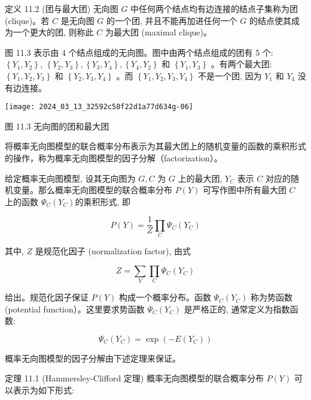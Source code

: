 \documentclass[10pt]{article}
\begin{document}
\begin{CJK*}{UTF8}{bsmi}
定义 11.2 (团与最大团) 无向图 $G$ 中任何两个结点均有边连接的结点子集称为团 (clique)。若 $C$ 是无向图 $G$ 的一个团, 并且不能再加进任何一个 $G$ 的结点使其成为一个更大的团, 则称此 $C$ 为最大团 (maximal clique)。

图 11.3 表示由 4 个结点组成的无向图。图中由两个结点组成的团有 5 个: $\left\{Y_{1}, Y_{2}\right\}$, $\left\{Y_{2}, Y_{3}\right\},\left\{Y_{3}, Y_{4}\right\},\left\{Y_{4}, Y_{2}\right\}$ 和 $\left\{Y_{1}, Y_{3}\right\}$ 。有两个最大团: $\left\{Y_{1}, Y_{2}, Y_{3}\right\}$ 和 $\left\{Y_{2}, Y_{3}, Y_{4}\right\}$ 。而 $\left\{Y_{1}, Y_{2}, Y_{3}, Y_{4}\right\}$ 不是一个团, 因为 $Y_{1}$ 和 $Y_{4}$ 没有边连接。

\begin{center}
\texttt{[image: 2024\_03\_13\_32592c58f22d1a77d634g-06]}
\end{center}

图 11.3 无向图的团和最大团

将概率无向图模型的联合概率分布表示为其最大团上的随机变量的函数的乘积形式的操作，称为概率无向图模型的因子分解（factorization）。

给定概率无向图模型, 设其无向图为 $G, C$ 为 $G$ 上的最大团, $Y_{C}$ 表示 $C$ 对应的随机变量。那么概率无向图模型的联合概率分布 $P(Y)$ 可写作图中所有最大团 $C$ 上的函数 $\Psi_{C}\left(Y_{C}\right)$的乘积形式, 即


\begin{equation*}
P(Y)=\frac{1}{Z} \prod_{C} \Psi_{C}\left(Y_{C}\right) \tag{11.5}
\end{equation*}


其中, $Z$ 是规范化因子 (normalization factor), 由式


\begin{equation*}
Z=\sum_{Y} \prod_{C} \Psi_{C}\left(Y_{C}\right) \tag{11.6}
\end{equation*}


给出。规范化因子保证 $P(Y)$ 构成一个概率分布。函数 $\Psi_{C}\left(Y_{C}\right)$ 称为势函数 (potential function）。这里要求势函数 $\Psi_{C}\left(Y_{C}\right)$ 是严格正的, 通常定义为指数函数:


\begin{equation*}
\Psi_{C}\left(Y_{C}\right)=\exp \left(-E\left(Y_{C}\right)\right) \tag{11.7}
\end{equation*}


概率无向图模型的因子分解由下述定理来保证。

定理 11.1 (Hammersley-Clifford 定理) 概率无向图模型的联合概率分布 $P(Y)$ 可以表示为如下形式:


\end{CJK*}
\end{document}
